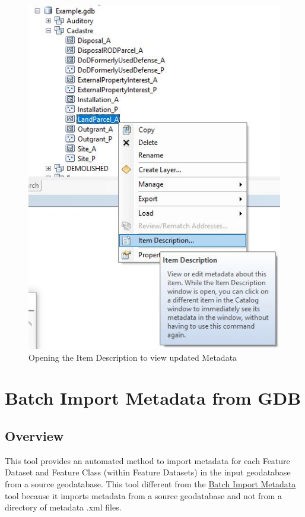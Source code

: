 \documentclass[openany]{book}
\theoremstyle{definition}
\theoremstyle{definition}
\theoremstyle{definition}
\theoremstyle{remark}
\begin{document}
\begin{figure}[H]

{\centering \includegraphics{figures/imMeta-after} 

}

\caption{Opening the Item Description to view updated Metadata}\label{fig:imMetaafter}
\end{figure}

\hypertarget{imMetaGDB}{\chapter{Batch Import Metadata from
GDB}\label{imMetaGDB}}

\section{Overview}\label{overview-12}

This tool provides an automated method to import metadata for each
Feature Dataset and Feature Class (within Feature Datasets) in the input
geodatabase from a source geodatabase. This tool different from the
\protect\hyperlink{imMeta}{Batch Import Metadata} tool because it
imports metadata from a source geodatabase and not from a directory of
metadata .xml files.
\end{document}
